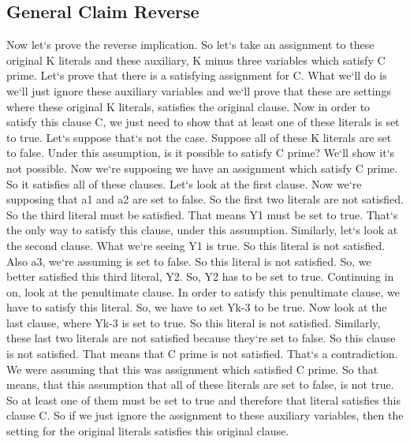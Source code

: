 \subsection{General Claim  Reverse}
Now let`s prove the reverse implication.
So let`s take an assignment to these original K literals and these auxiliary, K minus three variables which satisfy C prime.
Let`s prove that there is a satisfying assignment for C\@.
What we`ll do is we`ll just ignore these auxiliary variables and we`ll prove that these are settings where these original K literals, satisfies the original clause.
Now in order to satisfy this clause C, we just need to show that at least one of these literals is set to true.
Let`s suppose that`s not the case.
Suppose all of these K literals are set to false.
Under this assumption, is it possible to satisfy C prime? We`ll show it`s not possible.
Now we`re supposing we have an assignment which satisfy C prime.
So it satisfies all of these clauses.
Let`s look at the first clause.
Now we`re supposing that a1 and a2 are set to false.
So the first two literals are not satisfied.
So the third literal must be satisfied.
That means Y1 must be set to true.
That`s the only way to satisfy this clause, under this assumption.
Similarly, let`s look at the second clause.
What we`re seeing Y1 is true.
So this literal is not satisfied.
Also a3, we`re assuming is set to false.
So this literal is not satisfied.
So, we better satisfied this third literal, Y2.
So, Y2 has to be set to true.
Continuing in on, look at the penultimate clause.
In order to satisfy this penultimate clause, we have to satisfy this literal.
So, we have to set Yk-3 to be true.
Now look at the last clause, where Yk-3 is set to true.
So this literal is not satisfied.
Similarly, these last two literals are not satisfied because they`re set to false.
So this clause is not satisfied.
That means that C prime is not satisfied.
That`s a contradiction.
We were assuming that this was assignment which satisfied C prime.
So that means, that this assumption that all of these literals are set to false, is not true.
So at least one of them must be set to true and therefore that literal satisfies this clause C\@.
So if we just ignore the assignment to these auxiliary variables, then the setting for the original literals satisfies this original clause.

